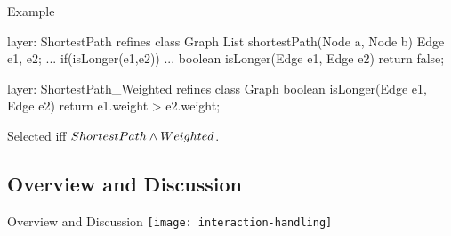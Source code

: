 \begin{frame}[fragile]{Example}
	\begin{mycolumns}[widths={50,50},animation=none]
\begin{codetight}{layer: ShortestPath}
refines class Graph {
	List shortestPath(Node a, Node b){
		Edge e1, e2;
		...
		if(isLonger(e1,e2)) 
		... 
	}
	boolean isLonger(Edge e1, Edge e2){
		return false;
	}
}
\end{codetight}	
	\mynextcolumn
\begin{codetight}{layer: ShortestPath\_Weighted}
refines class Graph {
	boolean isLonger(Edge e1, Edge e2){
		return e1.weight > e2.weight;
	}
}
\end{codetight}	
		\begin{note}{}	
			Selected iff $ShortestPath \wedge Weighted$. 
		\end{note}
	\end{mycolumns}
\end{frame}

\subsection{Overview and Discussion}

\begin{frame}{Overview and Discussion}
	\centering\texttt{[image: interaction-handling]}
\end{frame}


